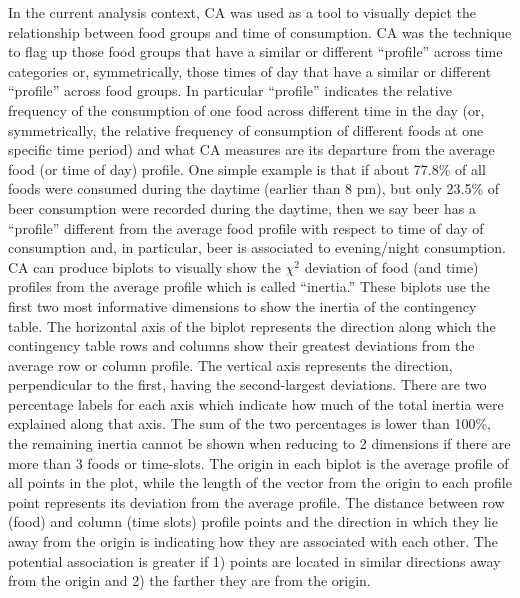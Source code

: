 \documentclass[utf8]{frontiersSCNS}
\begin{document}
In the current analysis context, CA was used as a tool to visually
depict the relationship between food groups and time of consumption. CA
was the technique to flag up those food groups that have a similar or
different ``profile'' across time categories or, symmetrically, those
times of day that have a similar or different ``profile'' across food
groups. In particular ``profile'' indicates the relative frequency of
the consumption of one food across different time in the day (or,
symmetrically, the relative frequency of consumption of different foods
at one specific time period) and what CA measures are its departure from
the average food (or time of day) profile. One simple example is that if
about 77.8\% of all foods were consumed during the daytime (earlier than
8 pm), but only 23.5\% of beer consumption were recorded during the
daytime, then we say beer has a ``profile'' different from the average
food profile with respect to time of day of consumption and, in
particular, beer is associated to evening/night consumption. CA can
produce biplots to visually show the \(\chi^2\) deviation of food (and
time) profiles from the average profile which is called ``inertia.''
These biplots use the first two most informative dimensions to show the
inertia of the contingency table. The horizontal axis of the biplot
represents the direction along which the contingency table rows and
columns show their greatest deviations from the average row or column
profile. The vertical axis represents the direction, perpendicular to
the first, having the second-largest deviations. There are two
percentage labels for each axis which indicate how much of the total
inertia were explained along that axis. The sum of the two percentages
is lower than 100\%, the remaining inertia cannot be shown when reducing
to 2 dimensions if there are more than 3 foods or time-slots. The origin
in each biplot is the average profile of all points in the plot, while
the length of the vector from the origin to each profile point
represents its deviation from the average profile. The distance between
row (food) and column (time slots) profile points and the direction in
which they lie away from the origin is indicating how they are
associated with each other. The potential association is greater if 1)
points are located in similar directions away from the origin and 2) the
farther they are from the origin.
\end{document}
